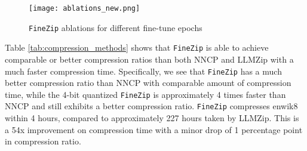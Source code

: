 \documentclass[11pt]{article}
\begin{document}
\setlength{\belowcaptionskip}{-10pt}
\begin{figure}
    \centering
    \texttt{[image: ablations\_new.png]} %
    \centering
    \caption{\texttt{FineZip} ablations for different fine-tune epochs}
    \centering
    \label{fig:finetune-lora}
    \centering
\end{figure}

Table \ref{tab:compression_methods} shows that \texttt{FineZip} is able to achieve comparable or better compression ratios than both NNCP and LLMZip with a much faster compression time. Specifically, we see that \texttt{FineZip} has a much better compression ratio than NNCP with comparable amount of compression time, while the 4-bit quantized \texttt{FineZip} is approximately 4 times faster than NNCP and still exhibits a better compression ratio. \texttt{FineZip} compresses enwik8 within 4 hours, compared to approximately 227 hours taken by LLMZip. This is a 54x improvement on compression time with a minor drop of 1 percentage point in compression ratio. %






\end{document}
